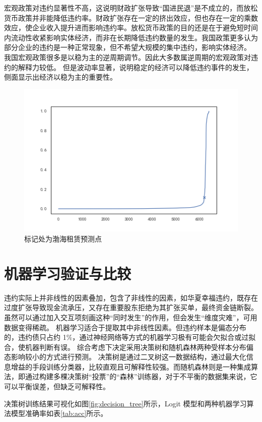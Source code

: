 宏观政策对违约显著性不高，这说明财政扩张导致“国进民退”是不成立的，而放松货币政策并非能降低违约率。财政扩张存在一定的挤出效应，但也存在一定的乘数效应，使企业收入提升进而影响违约率。放松货币政策的目的还是在于避免短时间内流动性收紧影响实体经济，而非在长期降低违约数量的发生。我国政策更多认为部分企业的违约是一种正常现象，但不希望大规模的集中违约，影响实体经济。
我国宏观政策很多是以稳为主的逆周期调节。因此大多数属逆周期的宏观政策对违约的解释力较低。
但是波动率显著，说明稳定的经济可以降低违约事件的发生，侧面显示出经济以稳为主的重要性。
\begin{figure}[ht]
	\centering
	\includegraphics[width=0.9\linewidth]{./data/渤海银行.png}
	\caption{标记处为渤海租赁预测点}
	\label{fig:bhyh}
\end{figure}

\section{机器学习验证与比较}
违约实际上并非线性的因素叠加，包含了非线性的因素，如华夏幸福违约，既存在过度扩张导致现金流承压，又存在重要股东拒绝为其扩张买单，最终资金链断裂。虽然可以通过加入交互项刻画这种“同时发生”的作用，但会发生“维度灾难”，可用数据变得稀疏。
机器学习适合于提取其中非线性因素。但违约样本是偏态分布的，违约债只占约 1\%，通过神经网络等方式的机器学习极有可能会欠拟合或过拟合，使机器判断有误。
综合考虑下决定采用决策树和随机森林两种受样本分布偏态影响较小的方式进行预测。
决策树是通过二叉树这一数据结构，通过最大化信息增益的手段训练分类器，比较直观且可解释性较强。而随机森林则是一种集成算法，即通过构建多棵决策树“投票”的“森林”训练器，对于不平衡的数据集来说，它可以平衡误差，但缺乏可解释性。

决策树训练结果可视化如图\ref{fig:decision_tree}所示，Logit 模型和两种机器学习算法模型准确率如表\ref{tab:acc}所示。

